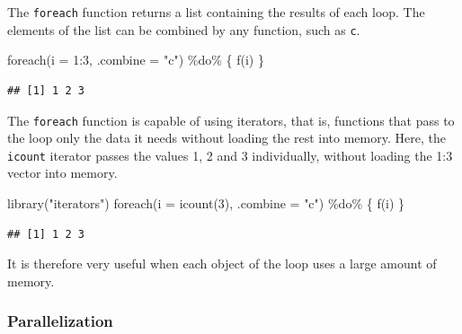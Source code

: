 \documentclass[
  12pt,
  american,
  a4paper,
  extrafontsizes,onecolumn,openright
  ]{memoir}
\newenvironment{Shaded}{\begin{snugshade}}{\end{snugshade}}
\newcommand{\AttributeTok}[1]{\textcolor[rgb]{0.77,0.63,0.00}{#1}}
\newcommand{\DecValTok}[1]{\textcolor[rgb]{0.00,0.00,0.81}{#1}}
\newcommand{\FunctionTok}[1]{\textcolor[rgb]{0.00,0.00,0.00}{#1}}
\newcommand{\NormalTok}[1]{#1}
\newcommand{\SpecialCharTok}[1]{\textcolor[rgb]{0.00,0.00,0.00}{#1}}
\newcommand{\StringTok}[1]{\textcolor[rgb]{0.31,0.60,0.02}{#1}}
\begin{document}
The \texttt{foreach} function returns a list containing the results of each loop.
The elements of the list can be combined by any function, such as \texttt{c}.

\scriptsize

\begin{Shaded}
\begin{Highlighting}[]
\FunctionTok{foreach}\NormalTok{(}\AttributeTok{i =} \DecValTok{1}\SpecialCharTok{:}\DecValTok{3}\NormalTok{, }\AttributeTok{.combine =} \StringTok{"c"}\NormalTok{) }\SpecialCharTok{\%do\%}\NormalTok{ \{}
    \FunctionTok{f}\NormalTok{(i)}
\NormalTok{\}}
\end{Highlighting}
\end{Shaded}

\begin{verbatim}
## [1] 1 2 3
\end{verbatim}

\normalsize

The \texttt{foreach} function is capable of using iterators, that is, functions that pass to the loop only the data it needs without loading the rest into memory.
Here, the \texttt{icount} iterator passes the values 1, 2 and 3 individually, without loading the 1:3 vector into memory.

\scriptsize

\begin{Shaded}
\begin{Highlighting}[]
\FunctionTok{library}\NormalTok{(}\StringTok{"iterators"}\NormalTok{)}
\FunctionTok{foreach}\NormalTok{(}\AttributeTok{i =} \FunctionTok{icount}\NormalTok{(}\DecValTok{3}\NormalTok{), }\AttributeTok{.combine =} \StringTok{"c"}\NormalTok{) }\SpecialCharTok{\%do\%}\NormalTok{ \{}
    \FunctionTok{f}\NormalTok{(i)}
\NormalTok{\}}
\end{Highlighting}
\end{Shaded}

\begin{verbatim}
## [1] 1 2 3
\end{verbatim}

\normalsize

It is therefore very useful when each object of the loop uses a large amount of memory.

\hypertarget{parallelization}{%
\subsubsection{Parallelization}\label{parallelization}}
\end{document}
